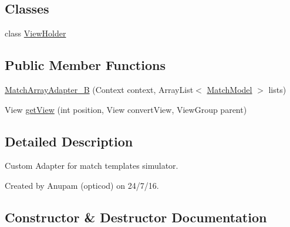 \subsection*{Classes}
\begin{DoxyCompactItemize}
\item 
class \hyperlink{classorg_1_1buildmlearn_1_1toolkit_1_1matchtemplate_1_1adapter_1_1MatchArrayAdapter__B_1_1ViewHolder}{View\+Holder}
\end{DoxyCompactItemize}
\subsection*{Public Member Functions}
\begin{DoxyCompactItemize}
\item 
\hyperlink{classorg_1_1buildmlearn_1_1toolkit_1_1matchtemplate_1_1adapter_1_1MatchArrayAdapter__B_a7e485be637def77a9fe93df639bde7c8}{Match\+Array\+Adapter\+\_\+B} (Context context, Array\+List$<$ \hyperlink{classorg_1_1buildmlearn_1_1toolkit_1_1matchtemplate_1_1data_1_1MatchModel}{Match\+Model} $>$ lists)
\item 
View \hyperlink{classorg_1_1buildmlearn_1_1toolkit_1_1matchtemplate_1_1adapter_1_1MatchArrayAdapter__B_a8f2ad53b2818be42e7bc1ebab4a1a9fc}{get\+View} (int position, View convert\+View, View\+Group parent)
\end{DoxyCompactItemize}


\subsection{Detailed Description}
Custom Adapter for match template\textquotesingle{}s simulator. 

Created by Anupam (opticod) on 24/7/16. 

\subsection{Constructor \& Destructor Documentation}

